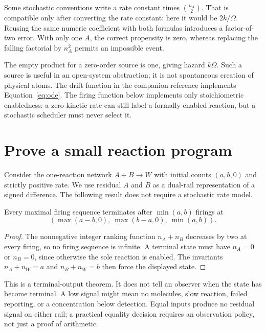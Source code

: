 Some stochastic conventions write a rate constant times $\binom{n_A}{2}$.
That is compatible only after converting the rate constant: here it would
be $2k/\Omega$. Reusing the same numeric coefficient with both formulas
introduces a factor-of-two error. With only one $A$, the correct propensity
is zero, whereas replacing the falling factorial by $n_A^2$ permits an
impossible event.

The empty product for a zero-order source is one, giving hazard $k\Omega$.
Such a source is useful in an open-system abstraction; it is not spontaneous
creation of physical atoms. The drift function in the companion reference
implements Equation~\ref{eq:ode}. The firing function below implements only
stoichiometric enabledness: a zero kinetic rate can still label a formally
enabled reaction, but a stochastic scheduler must never select it.

\section{Prove a small reaction program}

Consider the one-reaction network $A+B\rightarrow W$ with initial
counts $(a,b,0)$ and strictly positive rate. We use residual $A$ and $B$
as a dual-rail representation of a signed difference. The following result
does not require a stochastic rate model.

\begin{proposition}
Every maximal firing sequence terminates after $\min(a,b)$ firings at
\[
 (\max(a-b,0),\ \max(b-a,0),\ \min(a,b)).
\]
\end{proposition}
\begin{proof}
The nonnegative integer ranking function $n_A+n_B$ decreases by two at
every firing, so no firing sequence is infinite. A terminal state must have
$n_A=0$ or $n_B=0$, since otherwise the sole reaction is enabled.
The invariants $n_A+n_W=a$ and $n_B+n_W=b$ then force the displayed state.
\end{proof}

This is a terminal-output theorem. It does not tell an observer when the
state has become terminal. A low signal might mean no molecules, slow
reaction, failed reporting, or a concentration below detection. Equal inputs
produce no residual signal on either rail; a practical equality decision
requires an observation policy, not just a proof of arithmetic.

